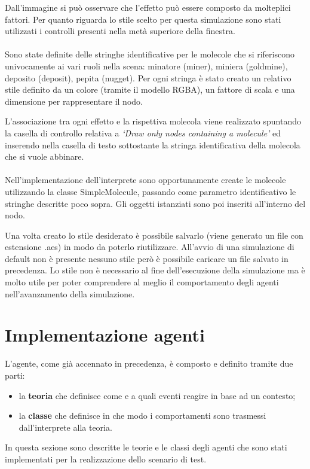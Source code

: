 Dall'immagine si può osservare che l'effetto può essere composto da molteplici fattori.
Per quanto riguarda lo stile scelto per questa simulazione sono stati utilizzati i controlli presenti nella metà superiore della finestra.

\paragraph*{}
Sono state definite delle stringhe identificative per le molecole che si riferiscono univocamente ai vari ruoli nella scena: minatore (miner), miniera (goldmine), deposito (deposit), pepita (nugget).
Per ogni stringa è stato creato un relativo stile definito da un colore (tramite il modello RGBA), un fattore di scala e una dimensione per rappresentare il nodo.

L'associazione tra ogni effetto e la rispettiva molecola viene realizzato spuntando la casella di controllo relativa a \textit{`Draw only nodes containing a molecule'} ed inserendo nella casella di testo sottostante la stringa identificativa della molecola che si vuole abbinare.

\paragraph*{}
Nell'implementazione dell'interprete sono opportunamente create le molecole utilizzando la classe SimpleMolecule, passando come parametro identificativo le stringhe descritte poco sopra. Gli oggetti istanziati sono poi inseriti all'interno del nodo.

Una volta creato lo stile desiderato è possibile salvarlo (viene generato un file con estensione .aes) in modo da poterlo riutilizzare.
All'avvio di una simulazione di default non è presente nessuno stile però è possibile caricare un file salvato in precedenza.
Lo stile non è necessario al fine dell'esecuzione della simulazione ma è molto utile per poter comprendere al meglio il comportamento degli agenti nell'avanzamento della simulazione.


\section{Implementazione agenti}
L'agente, come già accennato in precedenza, è composto e definito tramite due parti:
\begin{itemize}
\item la \textbf{teoria} che definisce come e a quali eventi reagire in base ad un contesto;
\item la \textbf{classe} che definisce in che modo i comportamenti sono trasmessi dall'interprete alla teoria.
\end{itemize}
In questa sezione sono descritte le teorie e le classi degli agenti che sono stati implementati per la realizzazione dello scenario di test.

